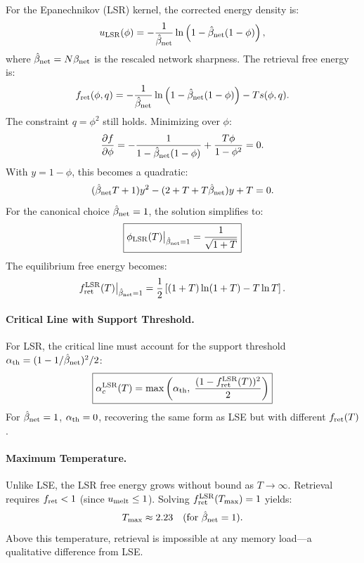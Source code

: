 \documentclass{article}
\theoremstyle{plain}
\theoremstyle{definition}
\theoremstyle{remark}
\begin{document}
For the Epanechnikov (LSR) kernel, the corrected energy density is:
\begin{equation}
    u_{\rm LSR}(\phi) = -\frac{1}{\hat{\beta}_{\rm net}} \ln\left(1 - \hat{\beta}_{\rm net}(1-\phi)\right),
\end{equation}
where $\hat{\beta}_{\rm net} = N\beta_{\rm net}$ is the rescaled network sharpness. The retrieval free energy is:
\begin{equation}
    f_{\rm ret}(\phi, q) = -\frac{1}{\hat{\beta}_{\rm net}} \ln\left(1 - \hat{\beta}_{\rm net}(1-\phi)\right) - T s(\phi, q).
\end{equation}
The constraint $q = \phi^2$ still holds. Minimizing over $\phi$:
\begin{equation}
    \frac{\partial f}{\partial \phi} = -\frac{1}{1 - \hat{\beta}_{\rm net}(1-\phi)} + \frac{T\phi}{1-\phi^2} = 0.
\end{equation}
With $y = 1 - \phi$, this becomes a quadratic:
\begin{equation}
    (\hat{\beta}_{\rm net} T + 1)y^2 - (2 + T + T\hat{\beta}_{\rm net})y + T = 0.
    \label{eq:lsr_quadratic}
\end{equation}
For the canonical choice $\hat{\beta}_{\rm net} = 1$, the solution simplifies to:
\begin{equation}
    \boxed{\phi_{\rm LSR}(T)\big|_{\hat{\beta}_{\rm net}=1} = \frac{1}{\sqrt{1+T}}}
    \label{eq:phi_lsr}
\end{equation}
The equilibrium free energy becomes:
\begin{equation}
    f_{\rm ret}^{\rm LSR}(T)\big|_{\hat{\beta}_{\rm net}=1} = \frac{1}{2}\left[(1+T)\ln(1+T) - T\ln T\right].
    \label{eq:f_lsr}
\end{equation}

\paragraph{Critical Line with Support Threshold.} For LSR, the critical line must account for the support threshold $\alpha_{\rm th} = (1 - 1/\hat{\beta}_{\rm net})^2/2$:
\begin{equation}
    \boxed{\alpha_c^{\rm LSR}(T) = \max\left(\alpha_{\rm th},\; \frac{(1 - f_{\rm ret}^{\rm LSR}(T))^2}{2}\right)}
    \label{eq:alpha_lsr}
\end{equation}
For $\hat{\beta}_{\rm net} = 1$, $\alpha_{\rm th} = 0$, recovering the same form as LSE but with different $f_{\rm ret}(T)$.

\paragraph{Maximum Temperature.} Unlike LSE, the LSR free energy grows without bound as $T \to \infty$. Retrieval requires $f_{\rm ret} < 1$ (since $u_{\rm melt} \le 1$). Solving $f_{\rm ret}^{\rm LSR}(T_{\max}) = 1$ yields:
\begin{equation}
    T_{\max} \approx 2.23 \quad (\text{for } \hat{\beta}_{\rm net} = 1).
\end{equation}
Above this temperature, retrieval is impossible at any memory load---a qualitative difference from LSE.
\end{document}

